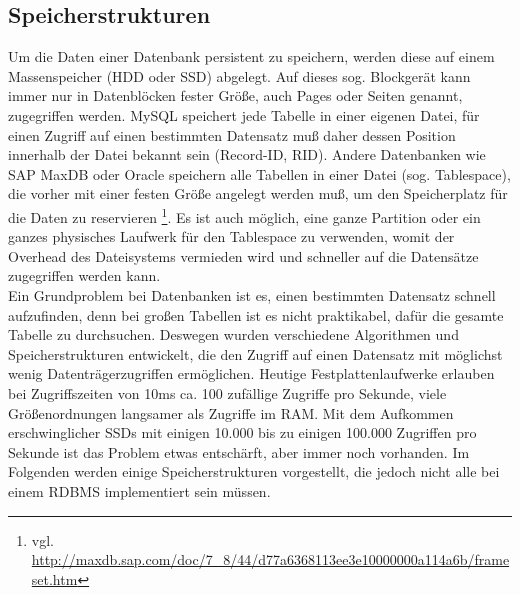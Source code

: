 \subsection{Speicherstrukturen}
Um die Daten einer Datenbank persistent zu speichern, werden diese auf einem Massenspeicher (HDD oder SSD)  abgelegt. Auf dieses sog. Blockgerät kann immer nur in Datenblöcken fester Größe, auch Pages oder Seiten genannt, zugegriffen werden. MySQL speichert jede Tabelle in einer eigenen Datei, für einen Zugriff auf einen bestimmten Datensatz muß daher dessen Position innerhalb der Datei bekannt sein (Record-ID, RID). Andere Datenbanken wie SAP MaxDB oder Oracle speichern alle Tabellen in einer Datei (sog. Tablespace), die vorher mit einer festen Größe angelegt werden muß, um den Speicherplatz für die Daten zu reservieren \footnote{vgl. \cite{SAP} \url{http://maxdb.sap.com/doc/7_8/44/d77a6368113ee3e10000000a114a6b/frameset.htm}}. Es ist auch möglich, eine ganze Partition oder ein ganzes physisches Laufwerk für den Tablespace zu verwenden, womit der Overhead des Dateisystems vermieden wird und schneller auf die Datensätze zugegriffen werden kann.
\\ Ein Grundproblem bei Datenbanken ist es, einen bestimmten Datensatz schnell aufzufinden, denn bei großen Tabellen ist es nicht praktikabel, dafür die gesamte Tabelle zu durchsuchen. Deswegen wurden verschiedene Algorithmen und Speicherstrukturen entwickelt, die den Zugriff auf einen Datensatz mit möglichst wenig Datenträgerzugriffen ermöglichen. Heutige Festplattenlaufwerke erlauben bei Zugriffszeiten von 10ms ca. 100 zufällige Zugriffe pro Sekunde, viele Größenordnungen langsamer als Zugriffe im RAM. Mit dem Aufkommen erschwinglicher SSDs mit einigen 10.000 bis zu einigen 100.000 Zugriffen pro Sekunde ist das Problem etwas entschärft, aber immer noch vorhanden. Im Folgenden werden einige Speicherstrukturen vorgestellt, die jedoch nicht alle bei einem RDBMS implementiert sein müssen.
